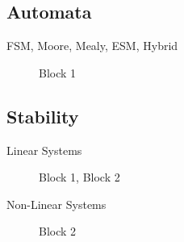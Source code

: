 
\subsection*{Automata}
\begin{description}
	\item[FSM, Moore, Mealy, ESM, Hybrid] Block 1
\end{description}

\subsection*{Stability}
\begin{description}
	\item[Linear Systems] Block 1, Block 2
	\item[Non-Linear Systems] Block 2
\end{description}